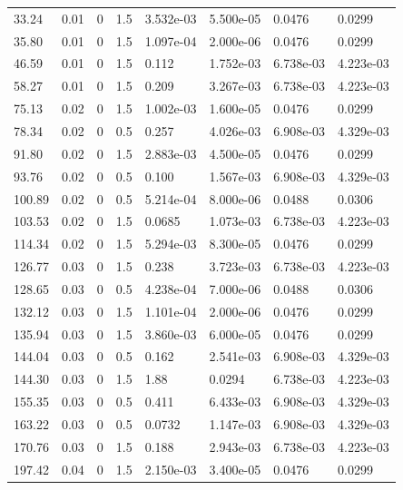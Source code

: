 \documentclass[preview]{standalone}
\begin{document}
{{\begin{tabular}{L{1.2cm}C{1.2cm} C{0.3cm}C{0.5cm} C{1.4cm}C{1.4cm} C{1.4cm}C{1.4cm}}
  33.24  &  0.01  & 0     & 1.5 &  3.532e-03  & 5.500e-05  & 0.0476 &  0.0299   \\ 
  35.80  &  0.01  & 0     & 1.5 &  1.097e-04  & 2.000e-06  & 0.0476 &  0.0299   \\ 
  46.59  &  0.01  & 0     & 1.5 &  0.112  & 1.752e-03  & 6.738e-03 &  4.223e-03   \\ 
  58.27  &  0.01  & 0     & 1.5 &  0.209  & 3.267e-03  & 6.738e-03 &  4.223e-03   \\ 
  75.13  &  0.02  & 0     & 1.5 &  1.002e-03  & 1.600e-05  & 0.0476 &  0.0299   \\ 
  78.34  &  0.02  & 0     & 0.5 &  0.257  & 4.026e-03  & 6.908e-03 &  4.329e-03   \\ 
  91.80  &  0.02  & 0     & 1.5 &  2.883e-03  & 4.500e-05  & 0.0476 &  0.0299   \\ 
  93.76  &  0.02  & 0     & 0.5 &  0.100  & 1.567e-03  & 6.908e-03 &  4.329e-03   \\ 
  100.89  &  0.02  & 0     & 0.5 &  5.214e-04  & 8.000e-06  & 0.0488 &  0.0306   \\ 
  103.53  &  0.02  & 0     & 1.5 &  0.0685  & 1.073e-03  & 6.738e-03 &  4.223e-03   \\ 
  114.34  &  0.02  & 0     & 1.5 &  5.294e-03  & 8.300e-05  & 0.0476 &  0.0299   \\ 
  126.77  &  0.03  & 0     & 1.5 &  0.238  & 3.723e-03  & 6.738e-03 &  4.223e-03   \\ 
  128.65  &  0.03  & 0     & 0.5 &  4.238e-04  & 7.000e-06  & 0.0488 &  0.0306   \\ 
  132.12  &  0.03  & 0     & 1.5 &  1.101e-04  & 2.000e-06  & 0.0476 &  0.0299   \\ 
  135.94  &  0.03  & 0     & 1.5 &  3.860e-03  & 6.000e-05  & 0.0476 &  0.0299   \\ 
  144.04  &  0.03  & 0     & 0.5 &  0.162  & 2.541e-03  & 6.908e-03 &  4.329e-03   \\ 
  144.30  &  0.03  & 0     & 1.5 &  1.88  & 0.0294  & 6.738e-03 &  4.223e-03   \\ 
  155.35  &  0.03  & 0     & 0.5 &  0.411  & 6.433e-03  & 6.908e-03 &  4.329e-03   \\ 
  163.22  &  0.03  & 0     & 0.5 &  0.0732  & 1.147e-03  & 6.908e-03 &  4.329e-03   \\ 
  170.76  &  0.03  & 0     & 1.5 &  0.188  & 2.943e-03  & 6.738e-03 &  4.223e-03   \\ 
  197.42  &  0.04  & 0     & 1.5 &  2.150e-03  & 3.400e-05  & 0.0476 &  0.0299   \\ 

\end{tabular}}}
\end{document}
